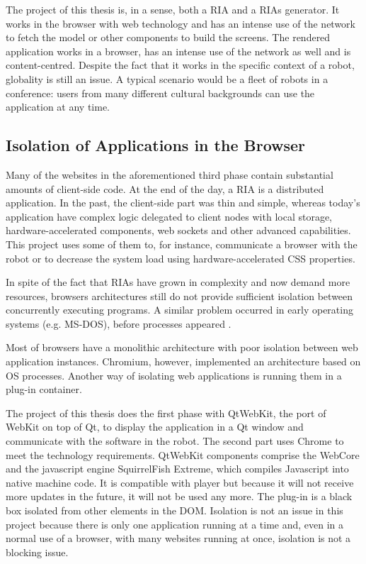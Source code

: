 The project of this thesis is, in a sense, both a \ac{RIA} and a \acp{RIA} generator. 
It works in the browser with web technology and has an intense use of the network to fetch the model or other components to build the screens.
The rendered application works in a browser, has an intense use of the network as well and is content-centred.
Despite the fact that it works in the specific context of a robot, globality is still an issue.
A typical scenario would be a fleet of robots in a conference: users from many different cultural backgrounds can use the application at any time.


\subsection{Isolation of Applications in the Browser}    
Many of the websites in the aforementioned third phase contain substantial amounts of client-side code. 
At the end of the day, a \ac{RIA} is a distributed application. 
In the past, the client-side part was thin and simple, whereas today's application have complex logic delegated to client nodes with local storage, hardware-accelerated components, web sockets and other advanced capabilities.
This project uses some of them to, for instance, communicate a browser with the robot or to decrease the system load using hardware-accelerated \ac{CSS} properties.

In spite of the fact that \acp{RIA} have grown in complexity and now demand more resources, browsers architectures still do not provide sufficient isolation between concurrently executing programs.
A similar problem occurred in early operating systems (e.g. MS-DOS), before processes appeared \cite{Reis:2009}. 

Most of browsers have a monolithic architecture with poor isolation between web application instances. Chromium, however, implemented an architecture based on \ac{OS} processes. 
Another way of isolating web applications is running them in a plug-in container. 

The project of this thesis does the first phase with QtWebKit, the port of WebKit on top of Qt, to display the application in a Qt window and communicate with the software in the robot. 
The second part uses Chrome to meet the technology requirements.
QtWebKit components comprise the WebCore and the javascript engine SquirrelFish Extreme, which compiles Javascript into native machine code. 
It is compatible with \flash player but because it will not receive more updates in the future, it will not be used any more.
The \flash plug-in is a black box isolated from other elements in the \ac{DOM}.
Isolation is not an issue in this project because there is only one application running at a time and, even in a normal use of a browser, with many websites running at once, isolation is not a blocking issue.


